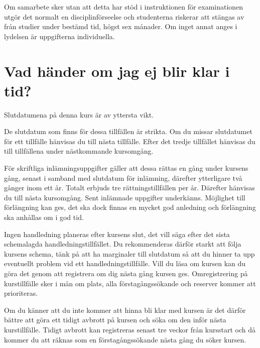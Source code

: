 \documentclass[a4paper,logo]{miunart}
\begin{document}
Om samarbete sker utan att detta har stöd i instruktionen för examinationen
utgör det normalt en disciplinförseelse och studenterna riskerar att 
stängas av från studier under bestämd tid, högst sex månader.
Om inget annat anges i lydelsen är uppgifterna individuella.


\section{Vad händer om jag ej blir klar i tid?}
\label{sec:late}
Slutdatumena på denna kurs är av yttersta vikt.

De slutdatum som finns för dessa tillfällen är strikta.
Om du missar slutdatumet för ett tillfälle hänvisas du till nästa tillfälle.
Efter det tredje tillfället hänvisas du till tillfällena under nästkommande 
kursomgång.

För skriftliga inlämningsuppgifter gäller att dessa rättas en gång under
kursens gång, senast i samband med slutdatum för inlämning, därefter
ytterligare två gånger inom ett år.
Totalt erbjuds tre rättningstillfällen per år.
Därefter hänvisas du till nästa kursomgång.
Sent inlämnade uppgifter underkänns.
Möjlighet till förlängning kan ges, det ska dock finnas en mycket god anledning
och förlängning ska anhållas om i god tid.

Ingen handledning planeras efter kursens slut, det vill säga efter det sista
schemalagda handledningstillfället.
Du rekommenderas därför starkt att följa kursens schema, tänk på att ha
marginaler till slutdatum så att du hinner ta upp eventuellt problem vid ett
handledningstillfälle.
Vill du läsa om kursen kan du göra det genom att registrera om dig nästa gång
kursen ges.
Omregistrering på kurstillfälle sker i mån om plats, alla förstagångssökande
och reserver kommer att prioriteras.

Om du känner att du inte kommer att hinna bli klar med kursen är det därför
bättre att göra ett tidigt avbrott på kursen och söka om den inför nästa
kurstillfälle.
Tidigt avbrott kan registreras senast tre veckor från kursstart och då kommer
du att räknas som en förstagångssökande nästa gång du söker kursen.

\printbibliography
\end{document}
